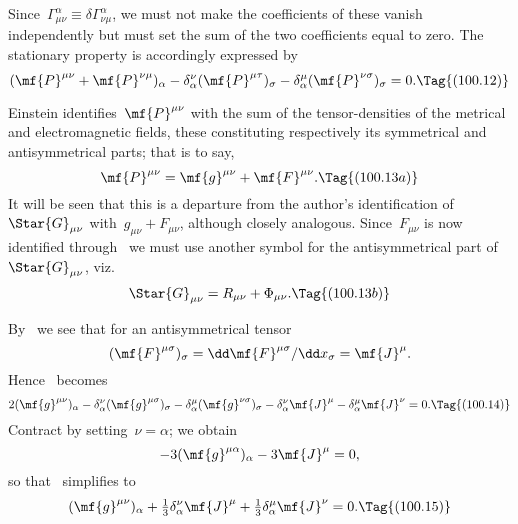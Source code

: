 \documentclass[12pt]{book}
\begin{document}
Since~$\Gamma^\alpha_{\mu\nu}\equiv\delta\Gamma^\alpha_{\nu\mu}$, we must not make the coefficients of these vanish
independently but must set the sum of the two coefficients equal to zero.
The stationary property is accordingly expressed by
\[
(\mf{P}^{\mu\nu}+\mf{P}^{\nu\mu})_\alpha
    - \delta^\nu_\alpha(\mf{P}^{\mu\tau})_\sigma - \delta^\mu_\alpha(\mf{P}^{\nu\sigma})_\sigma = 0.
\Tag{(100.12)}
\]

Einstein identifies~$\mf{P}^{\mu\nu}$ with the sum of the tensor\hyp{}densities of the metrical and electromagnetic
fields, these constituting respectively its symmetrical and antisymmetrical parts; that is to say,
\[
\mf{P}^{\mu\nu} = \mf{g}^{\mu\nu} + \mf{F}^{\mu\nu}.
\Tag{(100.13a)}
\]
It will be seen that this is a departure from the author's identification of~$\Star{G}_{\mu\nu}$
with~$g_{\mu\nu}+F_{\mu\nu}$, although closely analogous.
Since~$F_{\mu\nu}$ is now identified through~ we must use another symbol for the antisymmetrical
part of~$\Star{G}_{\mu\nu}$, viz.
\[
\Star{G}_{\mu\nu} = R_{\mu\nu} + \Phi_{\mu\nu}.
\Tag{(100.13b)}
\]

By~ we see that for an antisymmetrical tensor
\[
(\mf{F}^{\mu\sigma})_\sigma = \dd\mf{F}^{\mu\sigma}/\dd x_\sigma = \mf{J}^\mu.
\]
Hence~ becomes
\[
2(\mf{g}^{\mu\nu})_\alpha
  - \delta^\nu_\alpha(\mf{g}^{\mu\sigma})_\sigma
  - \delta^\mu_\alpha(\mf{g}^{\nu\sigma})_\sigma
  - \delta^\nu_\alpha\mf{J}^\mu
  - \delta^\mu_\alpha\mf{J}^\nu = 0.
\Tag{(100.14)}
\]
Contract by setting~$\nu=\alpha$; we obtain
\[
-3(\mf{g}^{\mu\alpha})_\alpha - 3\mf{J}^\mu = 0,
\]
so that~ simplifies to
\[
(\mf{g}^{\mu\nu})_\alpha + \tfrac{1}{3}\delta^\nu_\alpha\mf{J}^\mu + \tfrac{1}{3}\delta^\mu_\alpha\mf{J}^\nu = 0.
\Tag{(100.15)}
\]
\end{document}
